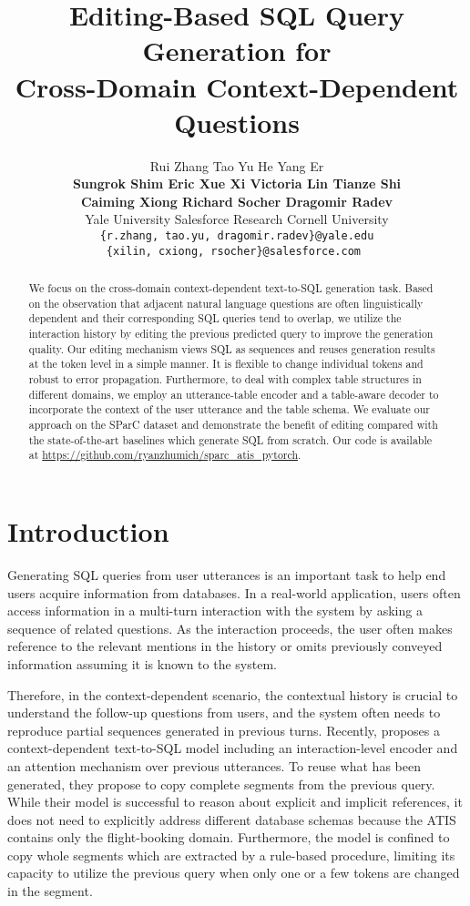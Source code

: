 \documentclass[11pt,a4paper]{article}
\title{Editing-Based SQL Query Generation for \\ Cross-Domain Context-Dependent Questions}
\author{
Rui Zhang
\quad Tao Yu
\quad He Yang Er
\\{\bf
\quad Sungrok Shim
\quad Eric Xue
\quad Xi Victoria Lin
\quad Tianze Shi}
\\{\bf
\quad Caiming Xiong
\quad Richard Socher
\quad Dragomir Radev}\\
 Yale University
\quad  Salesforce Research
\quad  Cornell University\\
\tt{\{r.zhang, tao.yu, dragomir.radev\}@yale.edu}\\
\tt{\{xilin, cxiong, rsocher\}@salesforce.com}
}
\date{}
\begin{document}
\maketitle
\begin{abstract}
We focus on the cross-domain context-dependent text-to-SQL generation task.
Based on the observation that adjacent natural language questions are often linguistically dependent and their corresponding SQL queries tend to overlap, we utilize the interaction history by editing the previous predicted query to improve the generation quality.
Our editing mechanism views SQL as sequences and reuses generation results at the token level in a simple manner.
It is flexible to change individual tokens and robust to error propagation.
Furthermore, to deal with complex table structures in different domains, we employ an utterance-table encoder and a table-aware decoder to incorporate the context of the user utterance and the table schema.
We evaluate our approach on the SParC dataset and demonstrate the benefit of editing compared with the state-of-the-art baselines which generate SQL from scratch.
Our code is available at \url{https://github.com/ryanzhumich/sparc_atis_pytorch}.
\end{abstract}

\section{Introduction}
Generating SQL queries from user utterances is an important task to help end users acquire information from databases.
In a real-world application, users often access information in a multi-turn interaction with the system by asking a sequence of related questions.
As the interaction proceeds, 
the user often makes reference to the relevant mentions 
in the history or omits previously conveyed information assuming it is known to the system.

Therefore, in the context-dependent scenario, the contextual history is crucial to understand the follow-up questions from users, and the system often needs to reproduce partial sequences generated in previous turns.
Recently,  proposes a context-dependent text-to-SQL model including an interaction-level encoder and an attention mechanism over previous utterances.
To reuse what has been generated, they propose to copy complete segments from the previous query.
While their model is successful to reason about explicit and implicit references, it does not need to explicitly address different database schemas because the ATIS contains only the flight-booking domain.
Furthermore, the model is confined to copy whole segments which are extracted by a rule-based procedure, limiting its capacity to utilize the previous query when only one or a few tokens are changed in the segment.
\end{document}
